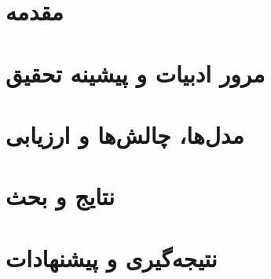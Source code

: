 \documentclass[msc]{VThesis}
\begin{document}
\baselineskip=1cm


\tableofcontents

\listoffigures
\newpage
{}
\chapter{مقدمه}

\chapter{مرور ادبیات و پیشینه تحقیق}

\chapter{مدل‌ها، چالش‌ها و ارزیابی}

\chapter{نتایج و بحث}

\chapter{نتیجه‌گیری و پیشنهادات}



\baselineskip=1cm


\printindex



\label{LastPage}
\end{document}
